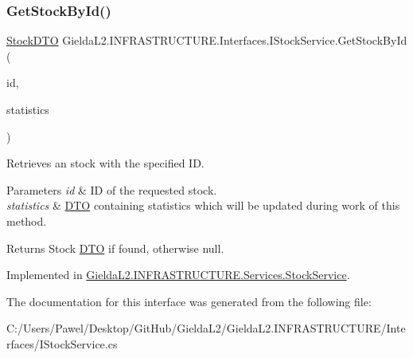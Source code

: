 \mbox{\label{interface_gielda_l2_1_1_i_n_f_r_a_s_t_r_u_c_t_u_r_e_1_1_interfaces_1_1_i_stock_service_ae04641f95a30ef6f62d499ef921646f7}} 
\subsubsection{\texorpdfstring{GetStockById()}{GetStockById()}}
{\footnotesize\ttfamily \mbox{\hyperlink{class_gielda_l2_1_1_i_n_f_r_a_s_t_r_u_c_t_u_r_e_1_1_d_t_o_1_1_stock_d_t_o}{Stock\+D\+TO}} Gielda\+L2.\+I\+N\+F\+R\+A\+S\+T\+R\+U\+C\+T\+U\+R\+E.\+Interfaces.\+I\+Stock\+Service.\+Get\+Stock\+By\+Id (\begin{DoxyParamCaption}\item[{int}]{id,  }\item[{\mbox{\hyperlink{class_gielda_l2_1_1_i_n_f_r_a_s_t_r_u_c_t_u_r_e_1_1_d_t_o_1_1_statistics_d_t_o}{Statistics\+D\+TO}}}]{statistics }\end{DoxyParamCaption})}



Retrieves an stock with the specified ID. 


\begin{DoxyParams}{Parameters}
{\em id} & ID of the requested stock.\\
\hline
{\em statistics} & \mbox{\hyperlink{namespace_gielda_l2_1_1_i_n_f_r_a_s_t_r_u_c_t_u_r_e_1_1_d_t_o}{D\+TO}} containing statistics which will be updated during work of this method.\\
\hline
\end{DoxyParams}
\begin{DoxyReturn}{Returns}
Stock \mbox{\hyperlink{namespace_gielda_l2_1_1_i_n_f_r_a_s_t_r_u_c_t_u_r_e_1_1_d_t_o}{D\+TO}} if found, otherwise null.
\end{DoxyReturn}


Implemented in \mbox{\hyperlink{class_gielda_l2_1_1_i_n_f_r_a_s_t_r_u_c_t_u_r_e_1_1_services_1_1_stock_service_ae8c734f66dfb438f446422df01ec994e}{Gielda\+L2.\+I\+N\+F\+R\+A\+S\+T\+R\+U\+C\+T\+U\+R\+E.\+Services.\+Stock\+Service}}.



The documentation for this interface was generated from the following file\+:\begin{DoxyCompactItemize}
\item 
C\+:/\+Users/\+Pawel/\+Desktop/\+Git\+Hub/\+Gielda\+L2/\+Gielda\+L2.\+I\+N\+F\+R\+A\+S\+T\+R\+U\+C\+T\+U\+R\+E/\+Interfaces/I\+Stock\+Service.\+cs\end{DoxyCompactItemize}
